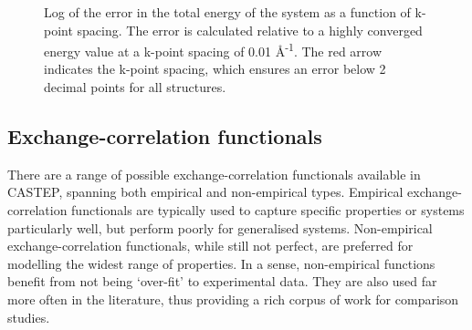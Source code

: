 \begin{figure}[h]
\begin{center}
		\caption{Log of the error in the total energy of the system as a function of k-point spacing. The error is calculated relative to a highly converged energy value at a k-point spacing of 0.01 \r{A}\textsuperscript{-1}. The red arrow indicates the k-point spacing, which ensures an error below 2 decimal points for all structures.}
		\label{Figure:kpoint_convergence}
	\end{center}
\end{figure}

\subsection{Exchange-correlation functionals}

There are a range of possible exchange-correlation functionals available in CASTEP, spanning both empirical and non-empirical types. Empirical exchange-correlation functionals are typically used to capture specific properties or systems particularly well, but perform poorly for generalised systems. Non-empirical exchange-correlation functionals, while still not perfect, are preferred for modelling the widest range of properties. In a sense, non-empirical functions benefit from not being `over-fit' to experimental data. They are also used far more often in the literature, thus providing a rich corpus of work for comparison studies.

